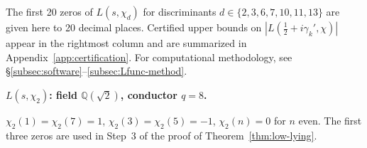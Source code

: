 \documentclass[12pt,reqno]{amsart}
\theoremstyle{plain}
\theoremstyle{definition}
\theoremstyle{remark}
\newcommand{\Q}{\mathbb{Q}}
\begin{document}
The first 20 zeros of $L(s,\chi_d)$ for discriminants $d \in \{2, 3, 6, 7, 10, 11, 13\}$ are given here to 20 decimal places.  Certified upper bounds on $|L(\tfrac{1}{2}+i\gamma_k',\chi)|$ appear in the rightmost column and are summarized in Appendix~\ref{app:certification}.  For computational methodology, see \S\ref{subsec:software}--\ref{subsec:Lfunc-method}.



\medskip\noindent\textbf{$L(s,\chi_2)$: field $\Q(\sqrt{2})$, conductor $q=8$.}\par\smallskip
\label{app:chi8-zeros}

$\chi_2(1)=\chi_2(7)=1$, $\chi_2(3)=\chi_2(5)=-1$, $\chi_2(n)=0$ for $n$ even.
The first three zeros are used in Step~3 of the proof of Theorem~\ref{thm:low-lying}.
\end{document}
